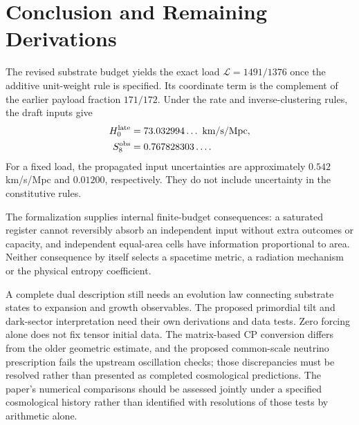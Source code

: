 \section{Conclusion and Remaining Derivations}
The revised substrate budget yields the exact load $\mathcal L=1491/1376$ once the additive unit-weight rule is specified. Its coordinate term is the complement of the earlier payload fraction $171/172$. Under the rate and inverse-clustering rules, the draft inputs give
\begin{equation}
\begin{split}
H_0^{\rm late}&=73.032994\ldots\ \mathrm{km/s/Mpc},\\
S_8^{\rm obs}&=0.767828303\ldots.
\end{split}
\end{equation}
For a fixed load, the propagated input uncertainties are approximately $0.542$ km/s/Mpc and $0.01200$, respectively. They do not include uncertainty in the constitutive rules.

The formalization supplies internal finite-budget consequences: a saturated register cannot reversibly absorb an independent input without extra outcomes or capacity, and independent equal-area cells have information proportional to area. Neither consequence by itself selects a spacetime metric, a radiation mechanism or the physical entropy coefficient.

A complete dual description still needs an evolution law connecting substrate states to expansion and growth observables. The proposed primordial tilt and dark-sector interpretation need their own derivations and data tests. Zero forcing alone does not fix tensor initial data. The matrix-based CP conversion differs from the older geometric estimate, and the proposed common-scale neutrino prescription fails the upstream oscillation checks; those discrepancies must be resolved rather than presented as completed cosmological predictions. The paper's numerical comparisons should be assessed jointly under a specified cosmological history rather than identified with resolutions of those tests by arithmetic alone.
